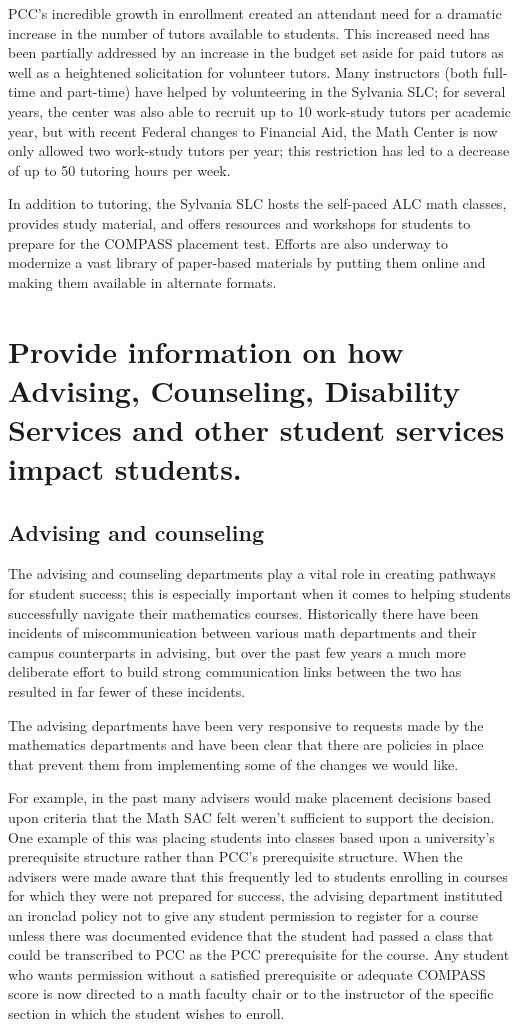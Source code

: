 PCC's incredible growth in enrollment created an attendant need for a dramatic
increase in the number of tutors available to students. This increased need has
been partially addressed by an increase in the budget set aside for paid tutors
as well as a heightened solicitation for volunteer tutors. Many
instructors (both full-time and part-time) have helped by volunteering in the
Sylvania SLC; for several years, the center was also able to recruit up to 10
work-study tutors per academic year, but with recent Federal changes to
Financial Aid, the Math Center is now only allowed two work-study tutors per
year; this restriction has led to a decrease of up to 50 tutoring hours per
week.

In addition to tutoring, the Sylvania SLC hosts the self-paced ALC math
classes, provides study material, and offers resources and workshops for
students to prepare for the COMPASS placement test. Efforts are also underway
to modernize a vast library of paper-based materials by putting them online and
making them available in alternate formats.


\section[Student services]{Provide information on how Advising, Counseling, Disability Services and other student services impact students. }
\subsection{Advising and counseling}
The advising and counseling departments play a vital role in creating pathways
for student success; this is especially important when it comes to helping
students successfully navigate their mathematics courses.  Historically there
have been incidents of miscommunication between various math departments and
their campus counterparts in advising, but over the past few years a much more
deliberate effort to build strong communication links  between the two has
resulted in far fewer of these incidents.

The advising departments have been very responsive to requests made by the
mathematics departments and have been clear that there are
policies in place that prevent them from implementing some of the changes we
would like.  

For example, in the past many advisers would make placement decisions based
upon criteria that the Math SAC felt weren't sufficient to support the
decision.   One example of this was placing students into classes based upon a
university's prerequisite structure rather than PCC's prerequisite structure.
When the advisers were made aware that this frequently led to students
enrolling in courses for which they were not prepared for success, the advising
department instituted an ironclad policy not to give any student permission to
register for a course unless there was documented evidence that the student had
passed a class that could be transcribed to PCC as the PCC prerequisite for
the course.  Any student who wants permission without a satisfied prerequisite
or adequate COMPASS score is now directed to a math faculty chair or to the
instructor of the specific section in which the student wishes to enroll.

